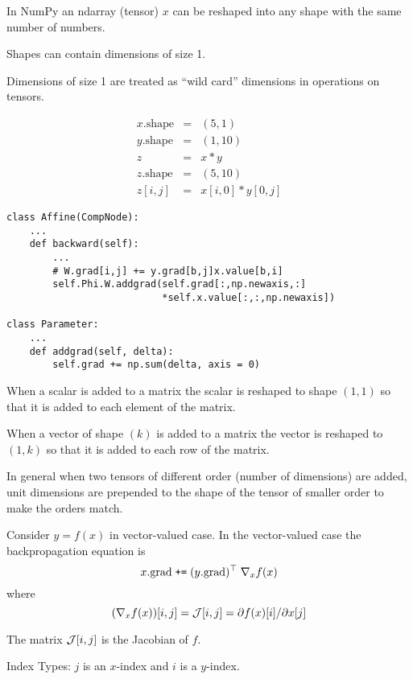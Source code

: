 {\vfill
In NumPy an ndarray (tensor) $x$ can be reshaped into any shape with the same number of numbers.


Shapes can contain dimensions of size 1.

\vfill
Dimensions of size 1 are treated as ``wild card'' dimensions in operations on tensors.

\vfill
\begin{eqnarray*}
  x.\mathrm{shape} & = & (5,1) \\
  y.\mathrm{shape} & = & (1,10) \\
  z & = & x*y \\
  z.\mathrm{shape} & = & (5,10) \\
  z[i,j] & = & x[i,0] * y[0,j]
\end{eqnarray*}

\vfill
\eject
\vfill
\begin{verbatim}
class Affine(CompNode):
    ...
    def backward(self):
        ...
        # W.grad[i,j] += y.grad[b,j]x.value[b,i]
        self.Phi.W.addgrad(self.grad[:,np.newaxis,:]
                           *self.x.value[:,:,np.newaxis])

class Parameter:
    ...
    def addgrad(self, delta):
        self.grad += np.sum(delta, axis = 0)
\end{verbatim}


When a scalar is added to a matrix the scalar is reshaped to shape $(1,1)$ so that it is added to each element of the matrix.

\vfill
When a vector of shape $(k)$ is added to a matrix the vector is reshaped to $(1,k)$ so that it is added to each row of the matrix.

\vfill
In general when two tensors of different order (number of dimensions) are added, unit dimensions are prepended to the shape of the tensor of smaller order
to make the orders match.

Consider $y =f(x)$ in vector-valued case.
\vfill
In the vector-valued case the backpropagation equation is
\vfill
$$x.\mathrm{grad}\; \mbox{\tt +=}\; (y.\mathrm{grad})^\top\; \nabla_x f(x)$$
\vfill
where
$$(\nabla_x f(x))[i,j] = {\cal J}[i,j] = \partial f(x)[i] /\partial x[j]$$

\vfill
The matrix ${\cal J}[i,j]$ is the Jacobian of $f$.

\vfill
Index Types: $j$ is an $x$-index and $i$ is a $y$-index.

}

